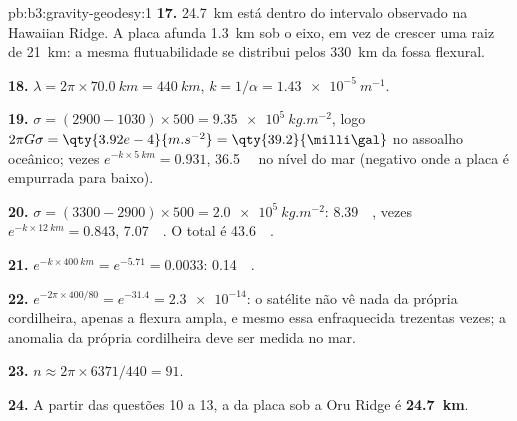 \begin{solution}{pb:b3:gravity-geodesy:1}
\textbf{17.} \qty{24.7}{km} está dentro do intervalo observado na Hawaiian Ridge. A
placa afunda \qty{1.3}{km} sob o eixo, em vez de crescer uma raiz de
\qty{21}{km}: a mesma flutuabilidade se distribui pelos \qty{330}{km} da fossa flexural.

\textbf{18.} $\lambda = 2\pi\times\qty{70.0}{km} = \qty{440}{km}$,
$k = 1/\alpha = \qty{1.43e-5}{m^{-1}}$.

\textbf{19.} $\sigma = (2900 - 1030)\times500 = \qty{9.35e5}{kg.m^{-2}}$, logo
$2\pi G\sigma = \qty{3.92e-4}{m.s^{-2}} = \qty{39.2}{\milli\gal}$ no assoalho oceânico;
vezes $e^{-k\times\qty{5}{km}} = 0.931$, \qty{36.5}{\milli\gal} no nível do mar
(negativo onde a placa é empurrada para baixo).

\textbf{20.} $\sigma = (3300 - 2900)\times500 = \qty{2.0e5}{kg.m^{-2}}$:
\qty{8.39}{\milli\gal}, vezes $e^{-k\times\qty{12}{km}} = 0.843$,
\qty{7.07}{\milli\gal}. O total é \qty{43.6}{\milli\gal}.

\textbf{21.} $e^{-k\times\qty{400}{km}} = e^{-5.71} = 0.0033$: \qty{0.14}{\milli\gal}.

\textbf{22.} $e^{-2\pi\times400/80} = e^{-31.4} = \num{2.3e-14}$: o satélite
não vê nada da própria cordilheira, apenas a flexura ampla, e mesmo essa
enfraquecida trezentas vezes; a anomalia da própria cordilheira deve ser medida no mar.

\textbf{23.} $n \approx 2\pi\times6371/440 = 91$.

\textbf{24.} A partir das questões 10 a 13, a  da
placa sob a Oru Ridge é
\textbf{\qty[text-series-to-math=true]{24.7}{km}}.
\end{solution}
